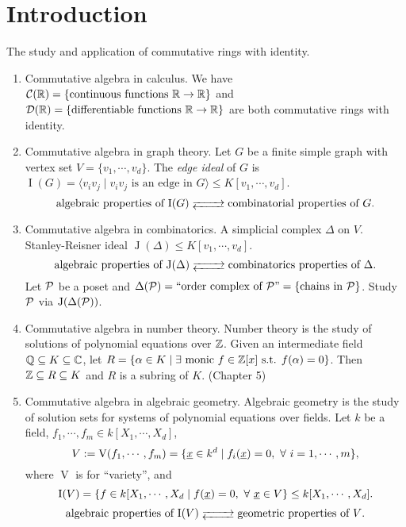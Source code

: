 \chapter*{Introduction}


The study and application of commutative rings with identity.
    \begin{enumerate}
        \item Commutative algebra in calculus. We have $\mathcal{C}(\mathbb{R}) = \{\text{continuous functions }\mathbb{R} \to \mathbb{R}\}$ and $\mathcal{D}(\mathbb{R}) = \{\text{differentiable functions }\mathbb{R} \to \mathbb{R}\}$ are both commutative rings with identity.
        \item Commutative algebra in graph theory. Let $G$ be a finite simple graph with vertex set $V = \{v_1,\cdots,v_d\}$. The \emph{edge ideal} of $G$ is $\operatorname{I}(G) = \langle v_iv_j \mid v_iv_j \text{ is an edge in }G \rangle \leq K[v_1,\cdots,v_d]$. 
            \[\text{algebraic properties of $\operatorname{I}(G)$} \myrightleftarrows{\rule{0.8cm}{0cm}} \text{combinatorial properties of $G$}.\]
        \item Commutative algebra in combinatorics.  A simplicial complex $\Delta$ on $V$. Stanley-Reisner ideal $\operatorname{J}(\Delta) \leq K[v_1,\cdots,v_d]$. 
            \[\text{algebraic properties of $\operatorname{J}(\Delta)$} \myrightleftarrows{\rule{0.8cm}{0cm}} \text{combinatorics properties of $\Delta$}.\]
            Let $\mathcal{P}$ be a poset and $\Delta(\mathcal{P}) = ``\text{order complex of $\mathcal{P}$''} = \{\text{chains in $\mathcal{P}$}\}$. Study $\mathcal{P}$ via $\operatorname{J}(\Delta(\mathcal{P}))$. 
        \item Commutative algebra in number theory. Number theory is the study of solutions of polynomial equations over $\mathbb{Z}$. Given an intermediate field $\mathbb{Q} \subseteq K \subseteq \mathbb{C}$, let $R = \{\alpha \in K \mid \exists \  \text{monic }f \in \mathbb{Z}[x] \text{ s.t. } f(\alpha) = 0\}$. Then $\mathbb{Z} \subseteq R \subseteq K$ and $R$ is a subring of $K$. (Chapter 5)
        \item Commutative algebra in algebraic geometry. Algebraic geometry is the study of solution sets for systems of polynomial equations over fields. Let $k$ be a field, $f_1,\cdots,f_m \in k[X_1,\cdots,X_d]$, 
            \[V := \operatorname{V}(f_1,\cdots,f_m) = \{\underline x \in k^d \mid f_i(\underline x) = 0,\ \forall \  i = 1,\cdots,m\},\] 
            where $\operatorname{V}$ is for ``variety'', and 
            \[\operatorname{I}(V) = \{f \in k[X_1,\cdots,X_d \mid f(\underline x) = 0,\ \forall \  \underline x \in V\} \leq k[X_1,\cdots,X_d].\] 
            \[\text{algebraic properties of $\operatorname{I}(V)$} \myrightleftarrows{\rule{0.8cm}{0cm}} \text{geometric properties of $V$}.\]
    \end{enumerate}

